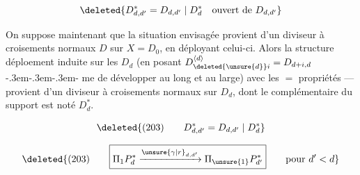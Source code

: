\[
\deleted{D_{d,d'}^*=D_{d,d'}\mid D_d^*\quad\text{ouvert de }D_{d,d'}}
\]

On suppose maintenant que la situation envisagée provient d'un diviseur à croisements normaux $D$ sur $X=D_0$, en déployant celui-ci. Alors  la structure  déploement induite sur les $D_d$ (en posant $D_{\deleted{\unsure{d}}i}^{\langle d\rangle}=D_{d+i,d}$ \mbox{-\kern.3em-\kern.3em-\kern.3em-}  me  de développer au long et au large) avec les $=$ propriétés ---  provient d'un diviseur à croisements normaux  sur $D_d$, dont le complémentaire du support est noté $D_d^*$.

\[
\deleted{(203)\qquad D_{d,d'}^*=D_{d,d'}\mid D_d^*}
\]

\[
\deleted{(203)\qquad\boxed{\Pi_1P_d^*\xrightarrow{\unsure{\gamma|r}_{d,d'}}\Pi_{\unsure{1}}P_{d'}^*}\qquad\text{pour }d'<d}
\]
